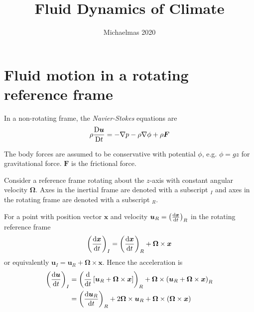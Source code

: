 \documentclass{jknotes}
\begin{document}
\title{Fluid Dynamics of Climate}
\date{Michaelmas 2020}

\maketitle
\suggestionsspiel
\tableofcontents

\section{Fluid motion in a rotating reference frame}
In a non-rotating frame, the \emph{Navier-Stokes} equations are
\begin{equation}
	\rho \frac{\mathrm{D} \bm{u}}{\mathrm{D} t} = -\nabla p - \rho \nabla \phi + \rho
	\bm{F}
	\label{ns}
\end{equation}

The body forces are assumed to be conservative with potential $\phi$, e.g.
$\phi = gz$ for gravitational force. $\bm{F}$ is the frictional force.

Consider a reference frame rotating about the $z$-axis with constant angular
velocity $\bm{\Omega}$. Axes in the inertial frame are denoted with a
subscript $_I$ and axes in the rotating frame are denoted with a subscript
$_R$.

\begin{center}

\end{center}

For a point with position vector $\bm{x}$ and velocity $\bm{u}_R =
\left(\frac{\diffd \bm{x}}{\diffd t}\right)_R$ in the rotating reference
frame
\begin{equation}
	\left(\frac{\diffd \bm{x}}{\diffd t}\right)_I = 
	\left(\frac{\diffd \bm{x}}{\diffd t}\right)_R + \bm{\Omega} \times \bm{x}
\end{equation}
or equivalently $\bm{u}_I = \bm{u}_R + \bm{\Omega} \times \bm{x}$. Hence the
acceleration is
\begin{equation}
	\begin{aligned}
		\left(\frac{\diffd \bm{u}}{\diffd t}\right)_I &= 
	\left(\frac{\diffd}{\diffd t}\left[ \bm{u}_R + \bm{\Omega} \times \bm{x}
			\right]\right)_R + \bm{\Omega} \times \left( \bm{u}_R +
		\bm{\Omega} \times \bm{x}\right)_R \\
		&= \left(\frac{\diffd \bm{u}_R}{\diffd t}\right)_R + 2 \bm{\Omega}
		\times \bm{u}_R + \bm{\Omega} \times \left( \bm{\Omega} \times
		\bm{x}\right)
	\end{aligned}
\end{equation}
\end{document}
